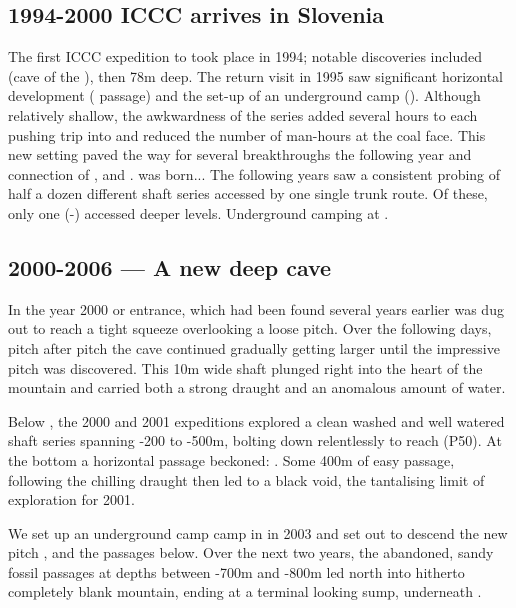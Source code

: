 \subsection{1994-2000  ICCC arrives in Slovenia} The first ICCC expedition to  took place in 1994; notable discoveries included  (cave of the ), then 78m deep. The return visit in 1995 saw significant horizontal development ( passage) and the set-up of an underground camp (). Although relatively shallow, the awkwardness of the  series added several hours to each pushing trip into  and reduced the number of man-hours at the coal face.
This new setting paved the way for several breakthroughs the following year and connection of ,  and .   was born... The following years saw a consistent probing of half a dozen different shaft series accessed by one single trunk route. Of these, only one (-) accessed deeper levels. Underground camping at .

\subsection{2000-2006 --- A new deep cave}

\label{sec:early vrtnarija}

 In the year 2000  or  entrance, which had been found several years earlier was dug out to reach a tight squeeze overlooking a loose pitch. Over the following days, pitch after pitch the cave continued gradually getting larger until the impressive  pitch was discovered. This 10m wide shaft plunged right into the heart of the mountain and carried both a strong draught and an anomalous amount of water. 

Below , the 2000 and 2001 expeditions explored a clean washed and well watered shaft series spanning -200 to -500m,  bolting down relentlessly to reach  (P50). At the bottom a horizontal passage beckoned: . Some 400m of easy passage, following the chilling draught then led to a black void, the tantalising limit of exploration for 2001.
    
We set up an underground camp camp in  in 2003 and set out to descend the new pitch , and the passages below. Over the next two years, the abandoned, sandy fossil passages at depths between -700m and -800m led north into hitherto completely blank mountain, ending at a terminal looking sump, underneath .

